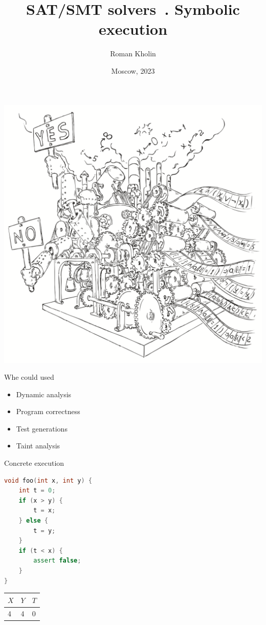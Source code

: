 \documentclass{beamer}
\begin{document}
\title{SAT/SMT solvers\ . Symbolic execution}
\author{Roman Kholin}
\date{Moscow, 2023}

\begin{frame}
\includegraphics[scale=0.5]{../decision-procedure.png}
\end{frame}

\frame{\titlepage}

\begin{frame}{Whe could used}
\begin{itemize}
\item Dynamic analysis
\item Program correctness
\item Test generations
\item Taint analysis
\end{itemize}
\end{frame}

\begin{frame}[fragile]{Concrete execution}
\begin{minipage}{0.49\textwidth}
\begin{lstlisting}[language=C++]
void foo(int x, int y) {
    int t = 0;
    if (x > y) {
        t = x;
    } else {
        t = y;
    }
    if (t < x) {
        assert false;
    }
}
\end{lstlisting}
\end{minipage}
\hfill
\begin{minipage}{0.49\textwidth}
\begin{center}
\begin{tabular}{ | l | l | l | }
\hline
$X$ & $Y$ & $T$ \\
\hline
4 & 4 & 0 \\
\hline
\end{tabular}
\end{center}
\end{minipage}
\end{frame}
\end{document}
